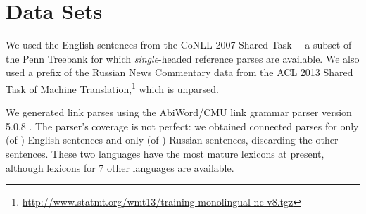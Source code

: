 \documentclass[11pt]{article}
\begin{document}


\section{Data Sets}
We used the English sentences from the CoNLL 2007 Shared Task \cite{CONLL-SHARED-2007}---a subset of the Penn Treebank for which {\em single}-headed reference parses are available. 
We also used a prefix of the Russian News Commentary data from the ACL 2013 Shared Task of Machine Translation,\footnote{\url{http://www.statmt.org/wmt13/training-monolingual-nc-v8.tgz}} which is unparsed.

We generated link parses using the AbiWord/CMU link grammar parser version 5.0.8 \cite{LINKPARSER-2014}.  The parser's coverage is not perfect: we obtained connected parses for only (of $\!\!$) English sentences and only (of $\!\!$) Russian sentences, discarding the other sentences.
These two languages have the most mature lexicons at present, although lexicons for 7 other languages are available.  
\end{document}
